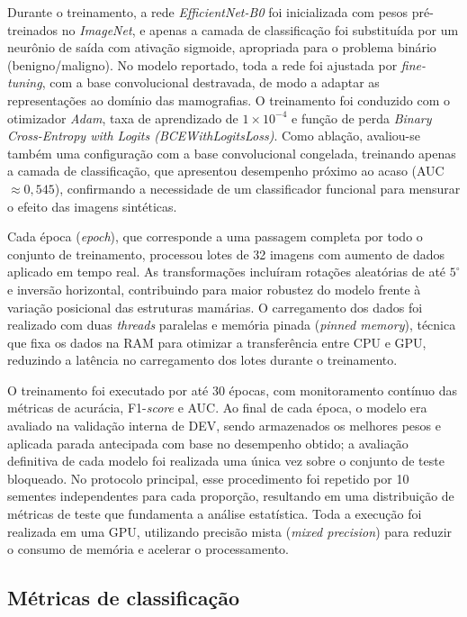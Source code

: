 \documentclass[
	12pt,				%
	openright,			%
	oneside,			%
	a4paper,			%
	tcc,			%
	]{ABNT-DC-UEL}
\begin{document}
Durante o treinamento, a rede \textit{EfficientNet-B0} foi inicializada com pesos pré-treinados no \textit{ImageNet}, e apenas a camada de classificação foi substituída por um neurônio de saída com ativação sigmoide, apropriada para o problema binário (benigno/maligno). No modelo reportado, toda a rede foi ajustada por \textit{fine-tuning}, com a base convolucional destravada, de modo a adaptar as representações ao domínio das mamografias. O treinamento foi conduzido com o otimizador \textit{Adam}, taxa de aprendizado de $1 \times 10^{-4}$ e função de perda \textit{Binary Cross-Entropy with Logits (BCEWithLogitsLoss)}. Como ablação, avaliou-se também uma configuração com a base convolucional congelada, treinando apenas a camada de classificação, que apresentou desempenho próximo ao acaso (AUC $\approx 0{,}545$), confirmando a necessidade de um classificador funcional para mensurar o efeito das imagens sintéticas.

Cada época (\textit{epoch}), que corresponde a uma passagem completa por todo o conjunto de treinamento, processou lotes de 32 imagens com aumento de dados aplicado em tempo real. As transformações incluíram rotações aleatórias de até $5^{\circ}$ e inversão horizontal, contribuindo para maior robustez do modelo frente à variação posicional das estruturas mamárias. O carregamento dos dados foi realizado com duas \textit{threads} paralelas e memória pinada (\textit{pinned memory}), técnica que fixa os dados na RAM para otimizar a transferência entre CPU e GPU, reduzindo a latência no carregamento dos lotes durante o treinamento.

O treinamento foi executado por até 30 épocas, com monitoramento contínuo das métricas de acurácia, F1-\textit{score} e AUC. Ao final de cada época, o modelo era avaliado na validação interna de DEV, sendo armazenados os melhores pesos e aplicada parada antecipada com base no desempenho obtido; a avaliação definitiva de cada modelo foi realizada uma única vez sobre o conjunto de teste bloqueado. No protocolo principal, esse procedimento foi repetido por 10 sementes independentes para cada proporção, resultando em uma distribuição de métricas de teste que fundamenta a análise estatística. Toda a execução foi realizada em uma GPU, utilizando precisão mista (\textit{mixed precision}) para reduzir o consumo de memória e acelerar o processamento.
 
\subsection{Métricas de classificação}
\end{document}
